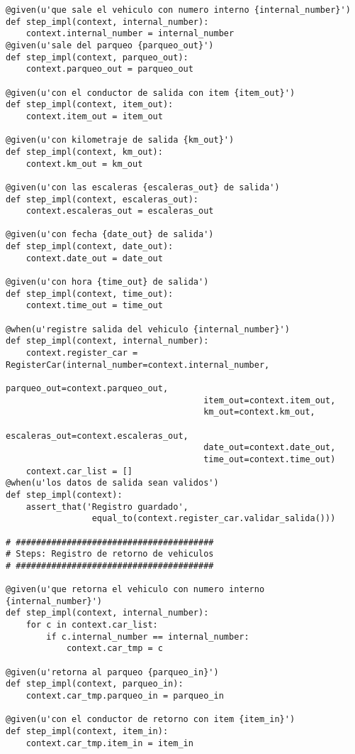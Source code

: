 {\begin{verbatim}
@given(u'que sale el vehiculo con numero interno {internal_number}')
def step_impl(context, internal_number):
    context.internal_number = internal_number
@given(u'sale del parqueo {parqueo_out}')
def step_impl(context, parqueo_out):
    context.parqueo_out = parqueo_out

@given(u'con el conductor de salida con item {item_out}')
def step_impl(context, item_out):
    context.item_out = item_out

@given(u'con kilometraje de salida {km_out}')
def step_impl(context, km_out):
    context.km_out = km_out

@given(u'con las escaleras {escaleras_out} de salida')
def step_impl(context, escaleras_out):
    context.escaleras_out = escaleras_out

@given(u'con fecha {date_out} de salida')
def step_impl(context, date_out):
    context.date_out = date_out

@given(u'con hora {time_out} de salida')
def step_impl(context, time_out):
    context.time_out = time_out

@when(u'registre salida del vehiculo {internal_number}')
def step_impl(context, internal_number):
    context.register_car = RegisterCar(internal_number=context.internal_number,
                                       parqueo_out=context.parqueo_out,
                                       item_out=context.item_out,
                                       km_out=context.km_out,
                                       escaleras_out=context.escaleras_out,
                                       date_out=context.date_out,
                                       time_out=context.time_out)
    context.car_list = []
@when(u'los datos de salida sean validos')
def step_impl(context):
    assert_that('Registro guardado',
                 equal_to(context.register_car.validar_salida()))

# #######################################
# Steps: Registro de retorno de vehiculos
# #######################################

@given(u'que retorna el vehiculo con numero interno {internal_number}')
def step_impl(context, internal_number):
    for c in context.car_list:
        if c.internal_number == internal_number:
            context.car_tmp = c

@given(u'retorna al parqueo {parqueo_in}')
def step_impl(context, parqueo_in):
    context.car_tmp.parqueo_in = parqueo_in

@given(u'con el conductor de retorno con item {item_in}')
def step_impl(context, item_in):
    context.car_tmp.item_in = item_in


\end{verbatim}}
